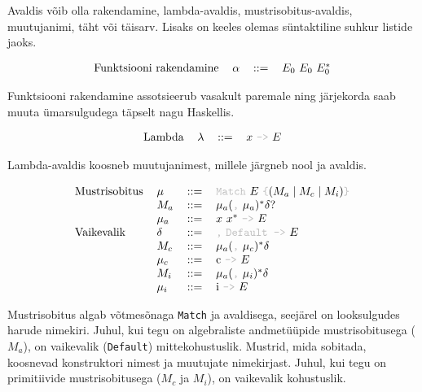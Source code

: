\documentclass[12pt]{article}
\begin{document}
    Avaldis võib olla rakendamine, lambda-avaldis, mustrisobitus-avaldis, muutujanimi, täht või täisarv. Lisaks on keeles olemas süntaktiline suhkur listide jaoks.

    \begin{equation*}
      \begin{tabular}{llll}
        Funktsiooni rakendamine & $\alpha$ & $::=$ & $E_0$ $E_0$ $E_0^*$
      \end{tabular}
    \end{equation*}

    Funktsiooni rakendamine assotsieerub vasakult paremale ning järjekorda saab muuta ümarsulgudega täpselt nagu Haskellis.

    \begin{equation*}
      \begin{tabular}{llll}
        Lambda & $\lambda$ & $::=$ & $x$ {\color{helehall}\verb!->!} $E$
      \end{tabular}
    \end{equation*}

    Lambda-avaldis koosneb muutujanimest, millele järgneb nool ja avaldis.

    \begin{equation*}
      \begin{tabular}{llll}
        Mustrisobitus & $\mu$    & $::=$ & {\color{helehall}\verb!Match!} $E$ {\color{helehall}\verb!{!}$(M_a\mid M_c\mid M_i)${\color{helehall}\verb!}!} \\
                      & $M_a$    & $::=$ & $\mu_a(${\color{helehall}\verb!,!} $\mu_a)^*\delta?$ \\
                      & $\mu_a$  & $::=$ & $x$ $x^*$ {\color{helehall}\verb!->!} $E$ \\
        Vaikevalik    & $\delta$ & $::=$ & {\color{helehall}\verb!,!} {\color{helehall}\verb!Default ->!} $E$ \\
                      & $M_c$    & $::=$ & $\mu_a(${\color{helehall}\verb!,!} $\mu_c)^*\delta$ \\
                      & $\mu_c$  & $::=$ & c {\color{helehall}\verb!->!} $E$ \\
                      & $M_i$    & $::=$ & $\mu_a(${\color{helehall}\verb!,!} $\mu_i)^*\delta$ \\
                      & $\mu_i$  & $::=$ & i {\color{helehall}\verb!->!} $E$
      \end{tabular}
    \end{equation*}

    Mustrisobitus algab võtmesõnaga \verb!Match! ja avaldisega, seejärel on looksulgudes harude nimekiri. Juhul, kui tegu on algebraliste andmetüüpide mustrisobitusega ($M_a$), on vaikevalik (\verb!Default!) mittekohustuslik. Mustrid, mida sobitada, koosnevad konstruktori nimest ja muutujate nimekirjast. Juhul, kui tegu on primitiivide mustrisobitusega ($M_c$ ja $M_i$), on vaikevalik kohustuslik.
\end{document}
